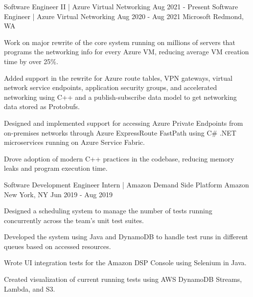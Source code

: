 

\begin{cventries}

  \cventrytwopositions
  {Software Engineer II | Azure Virtual Networking}
  {Aug 2021 - Present}
  {Software Engineer | Azure Virtual Networking}
  {Aug 2020 - Aug 2021}
  {Microsoft}
  {Redmond, WA}
  {
    \begin{cvitems} %
      \item {Work on major rewrite of the core system running on millions of servers that programs the networking info for every Azure VM, reducing average VM creation time by over 25\%.}
      \item {Added support in the rewrite for Azure route tables, VPN gateways, virtual network service endpoints, application security groups, and accelerated networking using C++ and a publish-subscribe data model to get networking data stored as Protobufs.}
      \item {Designed and implemented support for accessing Azure Private Endpoints from on-premises networks through Azure ExpressRoute FastPath using C\# .NET microservices running on Azure Service Fabric.}
      \item {Drove adoption of modern C++ practices in the codebase, reducing memory leaks and program execution time.}
    \end{cvitems}
  }

  \cventry
  {Software Development Engineer Intern | Amazon Demand Side Platform} %
  {Amazon} %
  {New York, NY} %
  {Jun 2019 - Aug 2019} %
  {
    \begin{cvitems} %
      \item {Designed a scheduling system to manage the number of tests running concurrently across the team's unit test suites.}
      \item {Developed the system using Java and DynamoDB to handle test runs in different queues based on accessed resources.}
      \item {Wrote UI integration tests for the Amazon DSP Console using Selenium in Java.}
      \item {Created visualization of current running tests using AWS DynamoDB Streams, Lambda, and S3.}
    \end{cvitems}
  }


\end{cventries}
